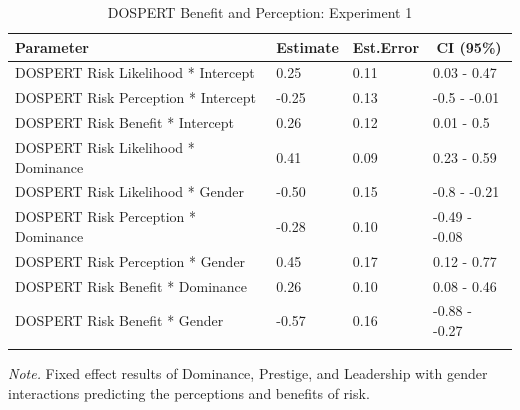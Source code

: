 \documentclass[
  donotrepeattitle,doc, 12pt, a4paper,floatsintext]{apa7}
\begin{document}
\begin{table}[ht]

\begin{center}
\begin{threeparttable}

\caption{\label{tab:m5-int-fixef-exp-1}DOSPERT Benefit and Perception: Experiment 1}

\small{

\begin{tabular}{llll}
\toprule
Parameter & \multicolumn{1}{c}{Estimate} & \multicolumn{1}{c}{Est.Error} & \multicolumn{1}{c}{CI (95\%)}\\
\midrule
DOSPERT Risk Likelihood * Intercept & 0.25 & 0.11 & 0.03 - 0.47\\
DOSPERT Risk Perception * Intercept & -0.25 & 0.13 & -0.5 - -0.01\\
DOSPERT Risk Benefit * Intercept & 0.26 & 0.12 & 0.01 - 0.5\\
DOSPERT Risk Likelihood * Dominance & 0.41 & 0.09 & 0.23 - 0.59\\
DOSPERT Risk Likelihood * Gender & -0.50 & 0.15 & -0.8 - -0.21\\
DOSPERT Risk Perception * Dominance & -0.28 & 0.10 & -0.49 - -0.08\\
DOSPERT Risk Perception * Gender & 0.45 & 0.17 & 0.12 - 0.77\\
DOSPERT Risk Benefit * Dominance & 0.26 & 0.10 & 0.08 - 0.46\\
DOSPERT Risk Benefit * Gender & -0.57 & 0.16 & -0.88 - -0.27\\
\bottomrule
\addlinespace
\end{tabular}

}

\begin{tablenotes}[para]
\normalsize{\textit{Note.} Fixed effect results of Dominance, Prestige, and Leadership with gender interactions predicting the perceptions and benefits of risk.}
\end{tablenotes}

\end{threeparttable}
\end{center}

\end{table}
\end{document}
